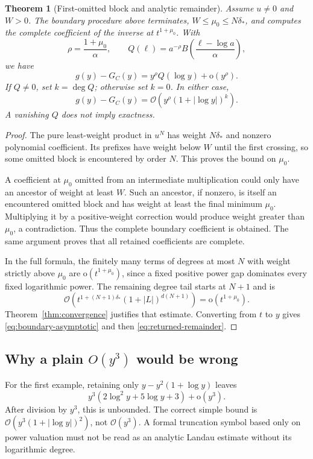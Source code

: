 \documentclass[11pt,a4paper]{article}
\numberwithin{equation}{section}
\newtheorem{theorem}{Theorem}[section]
\theoremstyle{definition}\newtheorem{definition}[theorem]{Definition}
\theoremstyle{remark}\newtheorem{remark}[theorem]{Remark}
\newcommand{\bigO}{\mathcal O}
\newcommand{\smallo}{\mathrm o}
\begin{document}
\begin{theorem}[First-omitted block and analytic remainder]\label{thm:frontier}
Assume \(u\ne0\) and \(W>0\). The boundary procedure above terminates,
\(W\le\mu_0\le N\delta_*\), and computes the complete coefficient of the
inverse at \(t^{1+\mu_0}\). With
\[
 \rho=\frac{1+\mu_0}{\alpha},\qquad
 Q(\ell)=a^{-\rho}B\!\left(\frac{\ell-\log a}{\alpha}\right),
\]
we have
\begin{equation}\label{eq:boundary-asymptotic}
 g(y)-G_C(y)=y^\rho Q(\log y)+\smallo(y^\rho).
\end{equation}
If \(Q\ne0\), set \(k=\deg Q\); otherwise set \(k=0\). In either case,
\begin{equation}\label{eq:returned-remainder}
 g(y)-G_C(y)=\bigO\!\left(y^\rho(1+|\log y|)^k\right).
\end{equation}
A vanishing \(Q\) does not imply exactness.
\end{theorem}
\begin{proof}
The pure least-weight product in \(u^N\) has weight \(N\delta_*\) and
nonzero polynomial coefficient. Its prefixes have weight below \(W\) until
the first crossing, so some omitted block is encountered by order \(N\).
This proves the bound on \(\mu_0\).

A coefficient at \(\mu_0\) omitted from an intermediate multiplication could
only have an ancestor of weight at least \(W\). Such an ancestor, if nonzero,
is itself an encountered omitted block and has weight at least the final
minimum \(\mu_0\). Multiplying it by a positive-weight correction would
produce weight greater than \(\mu_0\), a contradiction. Thus the complete
boundary coefficient is obtained. The same argument proves that all
retained coefficients are complete.

In the full formula, the finitely many terms of degrees at most \(N\) with
weight strictly above \(\mu_0\) are \(\smallo(t^{1+\mu_0})\), since a fixed
positive power gap dominates every fixed logarithmic power. The remaining
degree tail starts at \(N+1\) and is
\[
 \bigO\!\left(t^{1+(N+1)\delta_*}(1+|L|)^{d(N+1)}\right)
 =\smallo(t^{1+\mu_0}).
\]
Theorem~\ref{thm:convergence} justifies that estimate. Converting from \(t\)
to \(y\) gives \eqref{eq:boundary-asymptotic} and then
\eqref{eq:returned-remainder}.
\end{proof}

\subsection{Why a plain \texorpdfstring{$O(y^3)$}{O(y3)} would be wrong}
For the first example, retaining only \(y-y^2(1+\log y)\) leaves
\[
 y^3(2\log^2 y+5\log y+3)+\smallo(y^3).
\]
After division by \(y^3\), this is unbounded. The correct simple bound is
\(\bigO(y^3(1+|\log y|)^2)\), not \(\bigO(y^3)\).
A formal truncation symbol based only on power valuation must not be read as
an analytic Landau estimate without its logarithmic degree.
\end{document}
